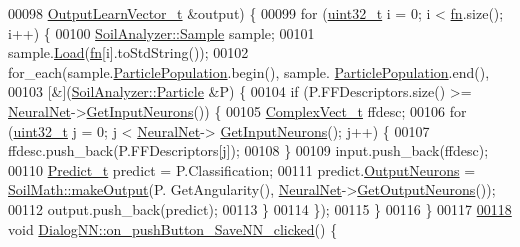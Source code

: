 \begin{DoxyCode}
{00098                                 \hyperlink{_soil_math_types_8h_a2d8b5a261688166d724b68addd8561e6}{OutputLearnVector\_t} &output) \{
00099   \textcolor{keywordflow}{for} (\hyperlink{_soil_math_types_8h_a435d1572bf3f880d55459d9805097f62}{uint32\_t} i = 0; i < \hyperlink{class_dialog_n_n_ac37477ba2781da043e5b2ce9495ea45f}{fn}.size(); i++) \{
00100     \hyperlink{class_soil_analyzer_1_1_sample}{SoilAnalyzer::Sample} sample;
00101     sample.\hyperlink{class_soil_analyzer_1_1_sample_afbb2db434d2e0a317c5b056371bf43fe}{Load}(\hyperlink{class_dialog_n_n_ac37477ba2781da043e5b2ce9495ea45f}{fn}[i].toStdString());
00102     for\_each(sample.\hyperlink{class_soil_analyzer_1_1_sample_a877bf12069fe09d2c8f9636f19ed5335}{ParticlePopulation}.begin(), sample.
      \hyperlink{class_soil_analyzer_1_1_sample_a877bf12069fe09d2c8f9636f19ed5335}{ParticlePopulation}.end(),
00103              [&](\hyperlink{class_soil_analyzer_1_1_particle}{SoilAnalyzer::Particle} &P) \{
00104                \textcolor{keywordflow}{if} (P.FFDescriptors.size() >= \hyperlink{class_dialog_n_n_a1d38f96a8f11697068e805fdaa3267b2}{NeuralNet}->\hyperlink{class_soil_math_1_1_n_n_a747371e8a53d1dd498e3f56c2ecece15}{GetInputNeurons}()) \{
00105                  \hyperlink{_soil_math_types_8h_a7567e521c2b2c408dcb62dbff72390f7}{ComplexVect\_t} ffdesc;
00106                  \textcolor{keywordflow}{for} (\hyperlink{_soil_math_types_8h_a435d1572bf3f880d55459d9805097f62}{uint32\_t} j = 0; j < \hyperlink{class_dialog_n_n_a1d38f96a8f11697068e805fdaa3267b2}{NeuralNet}->
      \hyperlink{class_soil_math_1_1_n_n_a747371e8a53d1dd498e3f56c2ecece15}{GetInputNeurons}(); j++) \{
00107                    ffdesc.push\_back(P.FFDescriptors[j]);
00108                  \}
00109                  input.push\_back(ffdesc);
00110                  \hyperlink{struct_predict__struct}{Predict\_t} predict = P.Classification;
00111                  predict.\hyperlink{struct_predict__struct_aa0708cae93baa061f21452537e86d3bd}{OutputNeurons} = \hyperlink{namespace_soil_math_a210cca0b7bfd4ca8af3590a7fc5fadb5}{SoilMath::makeOutput}(P.
      GetAngularity(), \hyperlink{class_dialog_n_n_a1d38f96a8f11697068e805fdaa3267b2}{NeuralNet}->\hyperlink{class_soil_math_1_1_n_n_ad993359d249d3a2a91d998df3cd7d85a}{GetOutputNeurons}());
00112                  output.push\_back(predict);
00113                \}
00114              \});
00115   \}
00116 \}
00117 
\hypertarget{dialognn_8cpp_source_l00118}{}\hyperlink{class_dialog_n_n_aaa6a74ab07099e65b19feceed3dda9f2}{00118} \textcolor{keywordtype}{void} \hyperlink{class_dialog_n_n_aaa6a74ab07099e65b19feceed3dda9f2}{DialogNN::on\_pushButton\_SaveNN\_clicked}() \{
}
\end{DoxyCode}
